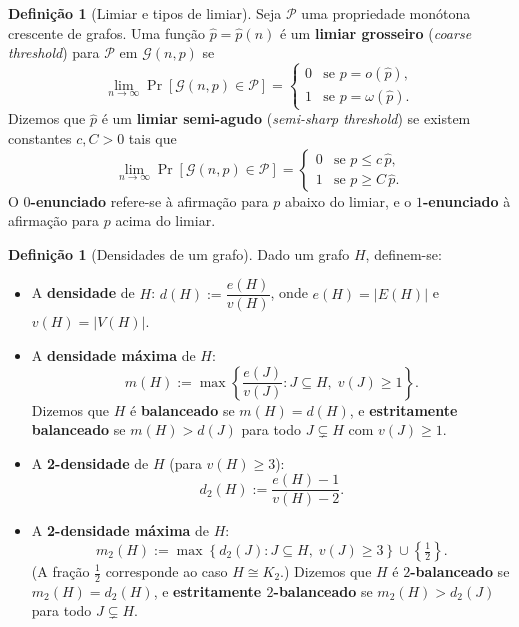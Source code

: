 \documentclass[reqno, 12pt]{amsart}
\numberwithin{equation}{section}
\theoremstyle{plain}
\theoremstyle{definition}
\newtheorem{definition}[theorem]{Definição}
\newcommand{\Gnp}{\mathcal{G}(n,p)}
\newcommand{\mdens}{m_2}
\newcommand{\maxdens}{m}
\begin{document}
\begin{definition}[Limiar e tipos de limiar]
    Seja $\mathcal{P}$ uma propriedade monótona crescente de grafos.
    Uma função $\hat{p} = \hat{p}(n)$ é um \textbf{limiar grosseiro} (\emph{coarse threshold})
    para $\mathcal{P}$ em $\Gnp$ se
    \[
        \lim_{n\to\infty} \Pr[\Gnp \in \mathcal{P}] =
        \begin{cases}
            0 & \text{se } p = o(\hat{p}),      \\
            1 & \text{se } p = \omega(\hat{p}).
        \end{cases}
    \]
    Dizemos que $\hat{p}$ é um \textbf{limiar semi-agudo} (\emph{semi-sharp threshold})
    se existem constantes $c, C > 0$ tais que
    \[
        \lim_{n\to\infty} \Pr[\Gnp \in \mathcal{P}] =
        \begin{cases}
            0 & \text{se } p \le c\,\hat{p}, \\
            1 & \text{se } p \ge C\,\hat{p}.
        \end{cases}
    \]
    O \textbf{$0$-enunciado} refere-se à afirmação para $p$ abaixo do limiar,
    e o \textbf{$1$-enunciado} à afirmação para $p$ acima do limiar.
\end{definition}

\begin{definition}[Densidades de um grafo]
    \label{def:densidades}
    Dado um grafo $H$, definem-se:
    \begin{itemize}
        \item A \textbf{densidade} de $H$:
              $d(H) := \dfrac{e(H)}{v(H)}$, onde $e(H) = |E(H)|$ e $v(H) = |V(H)|$.

        \item A \textbf{densidade máxima} de $H$:
              \[
                  \maxdens(H) := \max\!\left\{\frac{e(J)}{v(J)} : J \subseteq H,\; v(J) \ge 1\right\}.
              \]
              Dizemos que $H$ é \textbf{balanceado} se $\maxdens(H) = d(H)$, e
              \textbf{estritamente balanceado} se $\maxdens(H) > d(J)$ para todo
              $J \subsetneq H$ com $v(J) \ge 1$.

        \item A \textbf{2-densidade} de $H$ (para $v(H) \ge 3$):
              \[
                  d_2(H) := \frac{e(H)-1}{v(H)-2}.
              \]

        \item A \textbf{2-densidade máxima} de $H$:
              \[
                  \mdens(H) := \max\!\left\{d_2(J) : J \subseteq H,\; v(J) \ge 3\right\}
                  \cup \left\{\tfrac{1}{2}\right\}.
              \]
              (A fração $\frac{1}{2}$ corresponde ao caso $H \cong K_2$.)
              Dizemos que $H$ é \textbf{$2$-balanceado} se $\mdens(H) = d_2(H)$, e
              \textbf{estritamente $2$-balanceado} se $\mdens(H) > d_2(J)$ para todo
              $J \subsetneq H$.
    \end{itemize}
\end{definition}
\end{document}
